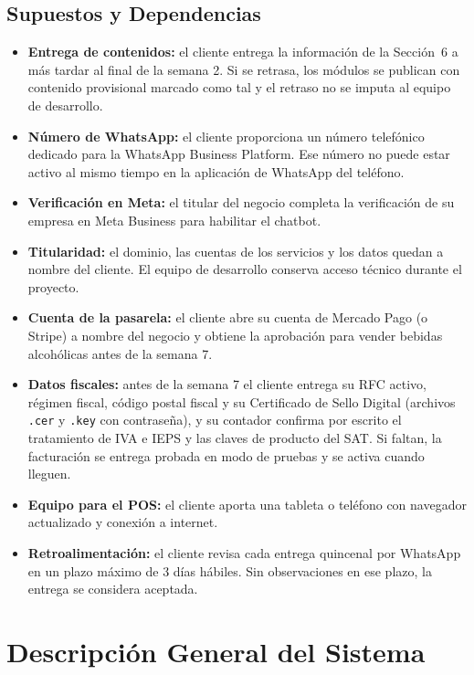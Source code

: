 \documentclass[11pt,letterpaper]{article}
\begin{document}
\subsection{Supuestos y Dependencias}
\begin{itemize}[leftmargin=1.5em]
    \item \textbf{Entrega de contenidos:} el cliente entrega la información de la Sección~6 a más tardar al final de la semana 2. Si se retrasa, los módulos se publican con contenido provisional marcado como tal y el retraso no se imputa al equipo de desarrollo.
    \item \textbf{Número de WhatsApp:} el cliente proporciona un número telefónico dedicado para la WhatsApp Business Platform. Ese número no puede estar activo al mismo tiempo en la aplicación de WhatsApp del teléfono.
    \item \textbf{Verificación en Meta:} el titular del negocio completa la verificación de su empresa en Meta Business para habilitar el chatbot.
    \item \textbf{Titularidad:} el dominio, las cuentas de los servicios y los datos quedan a nombre del cliente. El equipo de desarrollo conserva acceso técnico durante el proyecto.
    \item \textbf{Cuenta de la pasarela:} el cliente abre su cuenta de Mercado Pago (o Stripe) a nombre del negocio y obtiene la aprobación para vender bebidas alcohólicas antes de la semana 7.
    \item \textbf{Datos fiscales:} antes de la semana 7 el cliente entrega su RFC activo, régimen fiscal, código postal fiscal y su Certificado de Sello Digital (archivos \texttt{.cer} y \texttt{.key} con contraseña), y su contador confirma por escrito el tratamiento de IVA e IEPS y las claves de producto del SAT. Si faltan, la facturación se entrega probada en modo de pruebas y se activa cuando lleguen.
    \item \textbf{Equipo para el POS:} el cliente aporta una tableta o teléfono con navegador actualizado y conexión a internet.
    \item \textbf{Retroalimentación:} el cliente revisa cada entrega quincenal por WhatsApp en un plazo máximo de 3 días hábiles. Sin observaciones en ese plazo, la entrega se considera aceptada.
\end{itemize}

\section{Descripción General del Sistema}
\end{document}
